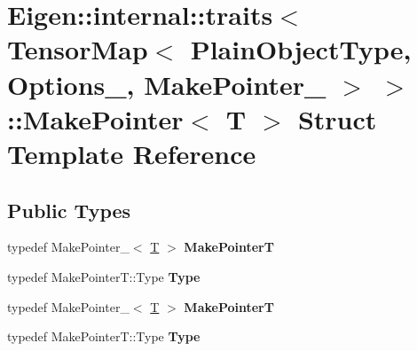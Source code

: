 \hypertarget{struct_eigen_1_1internal_1_1traits_3_01_tensor_map_3_01_plain_object_type_00_01_options___00_01_2ffe711dc868f2af95478b5bf448510f}{}\section{Eigen\+:\+:internal\+:\+:traits$<$ Tensor\+Map$<$ Plain\+Object\+Type, Options\+\_\+, Make\+Pointer\+\_\+ $>$ $>$\+:\+:Make\+Pointer$<$ T $>$ Struct Template Reference}
\label{struct_eigen_1_1internal_1_1traits_3_01_tensor_map_3_01_plain_object_type_00_01_options___00_01_2ffe711dc868f2af95478b5bf448510f}
\subsection*{Public Types}
\begin{DoxyCompactItemize}
\item 
\mbox{\label{struct_eigen_1_1internal_1_1traits_3_01_tensor_map_3_01_plain_object_type_00_01_options___00_01_2ffe711dc868f2af95478b5bf448510f_a36f1717a0c60f8a47ebef619fd64ff43}} 
typedef Make\+Pointer\+\_\+$<$ \hyperlink{group___sparse_core___module}{T} $>$ {\bfseries Make\+PointerT}
\item 
\mbox{\label{struct_eigen_1_1internal_1_1traits_3_01_tensor_map_3_01_plain_object_type_00_01_options___00_01_2ffe711dc868f2af95478b5bf448510f_ab661268584b47804419556d313da725e}} 
typedef Make\+Pointer\+T\+::\+Type {\bfseries Type}
\item 
\mbox{\label{struct_eigen_1_1internal_1_1traits_3_01_tensor_map_3_01_plain_object_type_00_01_options___00_01_2ffe711dc868f2af95478b5bf448510f_a36f1717a0c60f8a47ebef619fd64ff43}} 
typedef Make\+Pointer\+\_\+$<$ \hyperlink{group___sparse_core___module}{T} $>$ {\bfseries Make\+PointerT}
\item 
\mbox{\label{struct_eigen_1_1internal_1_1traits_3_01_tensor_map_3_01_plain_object_type_00_01_options___00_01_2ffe711dc868f2af95478b5bf448510f_ab661268584b47804419556d313da725e}} 
typedef Make\+Pointer\+T\+::\+Type {\bfseries Type}
\end{DoxyCompactItemize}


